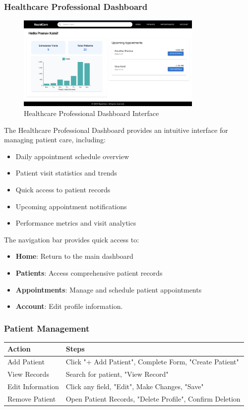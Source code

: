 \documentclass[12pt, titlepage]{article}
\begin{document}
\subsubsection{Healthcare Professional Dashboard}
\begin{figure}[H]
\centering
\includegraphics[width=0.8\textwidth]{healthcare.png}
\caption{Healthcare Professional Dashboard Interface}
\label{fig:healthcare_dashboard}
\end{figure}

The Healthcare Professional Dashboard provides an intuitive interface for managing patient care, including:
\begin{itemize}
\item Daily appointment schedule overview
\item Patient visit statistics and trends
\item Quick access to patient records
\item Upcoming appointment notifications
\item Performance metrics and visit analytics
\end{itemize}

The navigation bar provides quick access to:
\begin{itemize}
\item \textbf{Home}: Return to the main dashboard
\item \textbf{Patients}: Access comprehensive patient records
\item \textbf{Appointments}: Manage and schedule patient appointments
\item \textbf{Account}: Edit profile information.
\end{itemize}

\subsubsection{Patient Management}
\begin{longtable}{p{}p{}}
\toprule
\textbf{Action} & \textbf{Steps} \\
\midrule
Add Patient & Click "+ Add Patient", Complete Form, "Create Patient" \\
View Records & Search for patient, "View Record" \\
Edit Information & Click any field, "Edit", Make Changes, "Save" \\
Remove Patient & Open Patient Records, "Delete Profile", Confirm Deletion \\
\bottomrule
\end{longtable}
\end{document}
